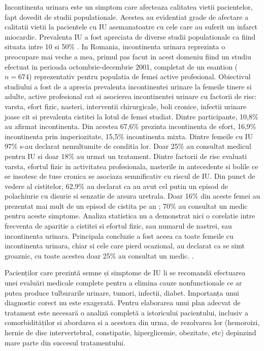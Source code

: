 \documentclass[12pt,draft]{article}
\begin{document}
Incontinenta urinara este un simptom care afecteaza calitatea vietii pacientelor, fapt dovedit de studii populationale. Acestea au evidentiat grade de afectare a calitatii vietii la pacientele cu \ac{IU} asemanatoatre cu cele care au suferit un infarct miocardic. Prevalenta \ac{IU} a fost apreciata de diverse studii populationale ca fiind situata intre 10 si 50\% . 
In Romania, incontinenta urinara reprezinta o preocupare mai veche a mea, primul pas facut in acest domeniu fiind un studiu efectuat in perioada octombrie-decembrie 2001, completat de un esantion ($n=674$) reprezentativ pentru populatia de femei active profesional.
Obiectivul studiului a fost de a aprecia prevalenta incontinentei urinare la femeile tinere si adulte, active profesional cat si asocierea incontinentei urinare cu factorii de risc: varsta, efort fizic, nasteri, interventii chirurgicale, boli cronice, infectii urinare joase cit si prevalenta cistitei la lotul de femei studiat.
Dintre participante, 10,8\% au afirmat incontinenta. Din acestea 67,6\% prezinta incontinenta de efort, 16,9\% incontinenta prin imperiozitate, 15,5\% incontinenta mixta. 
Dintre femeile cu \ac{IU} 97\% s-au declarat nemultumite de conditia lor. Doar 25\% au consultat medicul pentru IU si doar 18\% au urmat un tratament. 
Dintre factorii de risc evaluati varsta, efortul fizic in activitatea profesionala, nasterile in antecedente si bolile ce se insotesc de tuse cronica se asociaza semnificativ cu riscul de IU. 
Din punct de vedere al cistitelor, 62,9\% au declarat ca au avut cel putin un episod de polachiurie cu disurie si senzatie de arsura uretrala.
Doar 16\% din aceste femei au prezentat mai mult de un episod de cistita pe an ; 70\% au consultat un medic pentru aceste simptome. 
Analiza statistica nu a demonstrat nici o corelatie intre frecventa de aparitie a cistitei si efortul fizic, sau numarul de nastrei, sau incontinenta urinara. 
Principala concluzie a fost aceea ca toate femeile cu incontinenta urinara, chiar si cele care pierd ocazional, au declarat ca se simt groaznic, cu toate acestea doar 25\% au consultat un medic. \citep{Manu04}.

Pacienților care prezintă semne și simptome de IU li se recomandă efectuarea unei evaluări medicale complete pentru a elimina cauze nonfunctionale ce ar putea produce tulburarile urinare, tumori, infectii, diabet. Importanța unui diagnostic corect nu este exagerată. 
Pentru elaborarea unui plan adecvat de tratament este necesară o analiză completă a istoricului pacientului, inclusiv a comorbidităților si abordarea si a acestora din urma, de rezolvarea lor (hemoroizi, hernie de disc intervertebral, constipatie, hiperglicemie, obezitate, etc) depinzind mare parte din succesul tratamentului.
\end{document}

